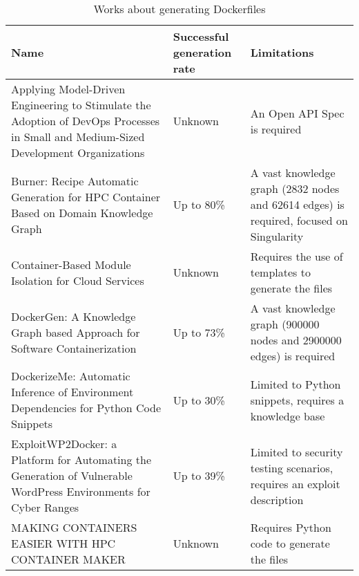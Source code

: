 \begin{table}[H]
    \centering
    \begin{tabular}{|p{}|p{}|p{}|}
        \hline \textbf{Name} & \textbf{Successful generation rate} & \textbf{Limitations} \\
        \hline Applying Model-Driven Engineering to Stimulate the Adoption of DevOps Processes in Small and Medium-Sized Development Organizations \cite{sorgallaApplyingModelDrivenEngineering2021} & Unknown & An Open API Spec is required \\
        \hline Burner: Recipe Automatic Generation for HPC Container Based on Domain Knowledge Graph \cite{zhongBurnerRecipeAutomatic2022} & Up to 80\% & A vast knowledge graph (2832 nodes and 62614 edges) is required, focused on Singularity \\
        \hline Container-Based Module Isolation for Cloud Services \cite{kehrerContainerBasedModuleIsolation2019} & Unknown & Requires the use of templates to generate the files \\
        \hline DockerGen: A Knowledge Graph based Approach for Software Containerization \cite{yeDockerGenKnowledgeGraph2021} & Up to 73\% & A vast knowledge graph (900000 nodes and 2900000 edges) is required \\
        \hline DockerizeMe: Automatic Inference of Environment Dependencies for Python Code Snippets \cite{hortonDockerizeMeAutomaticInference2019} & Up to 30\% & Limited to Python snippets, requires a knowledge base \\
        \hline ExploitWP2Docker: a Platform for Automating the Generation of Vulnerable WordPress Environments for Cyber Ranges \cite{caturanoExploitWP2DockerPlatformAutomating2022} & Up to 39\% & Limited to security testing scenarios, requires an exploit description \\
        \hline MAKING CONTAINERS EASIER WITH HPC CONTAINER MAKER \cite{mcmillanMAKINGCONTAINERSEASIER} & Unknown & Requires Python code to generate the files \\
        \hline
    \end{tabular}
    \caption{Works about generating Dockerfiles}
    \label{tab:works_dockerfile_generation}
\end{table}



